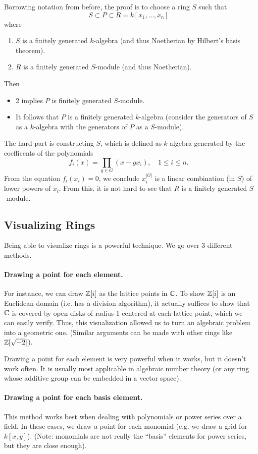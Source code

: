Borrowing notation from before, the proof is to choose a ring $S$ such that
\[
    S \subset P \subset R = k[x_1, \dots, x_n]
\]
where
\begin{enumerate}
    \item $S$ is a finitely generated $k$-algebra (and thus Noetherian by Hilbert's basis theorem).
    \item $R$ is a finitely generated $S$-module (and thus Noetherian).
\end{enumerate}
Then
\begin{itemize}
    \item 2 implies $P$ is finitely generated $S$-module.
    \item It follows that $P$ is a finitely generated $k$-algebra (consider the generators of $S$ as a $k$-algebra with the generators of $P$ as a $S$-module).
\end{itemize}
The hard part is constructing $S$, which is defined as $k$-algebra generated by the coefficents of the polynomials
\[
    f_i(x) = \prod_{g \in G} (x-gx_i), \quad 1 \leq i \leq n.
\]
From the equation $f_i(x_i) = 0$, we conclude $x_i^{|G|}$ is a linear combination (in $S$) of lower powers of $x_i$. From this, it is not hard to see that $R$ is a finitely generated $S$-module.

\subsection{Visualizing Rings}
Being able to visualize rings is a powerful technique. We go over 3 different methods.

\paragraph{Drawing a point for each element.} For instance, we can draw ${\mathbb Z}[i]$ as the lattice points in ${\mathbb C}$. To show ${\mathbb Z}[i]$ is an Euclidean domain (i.e. has a division algorithm), it actually suffices to show that ${\mathbb C}$ is covered by open disks of radius 1 centered at each lattice point, which we can easily verify. Thus, this visualization allowed us to turn an algebraic problem into a geometric one. (Similar arguments can be made with other rings like ${\mathbb Z}[\sqrt{-2}]$).

Drawing a point for each element is very powerful when it works, but it doesn't work often. It is usually most applicable in algebraic number theory (or any ring whose additive group can be embedded in a vector space).

\paragraph{Drawing a point for each basis element.} This method works best when dealing with polynomials or power series over a field. In these cases, we draw a point for each monomial (e.g. we draw a grid for $k[x,y]$). (Note: monomials are not really the ``basis'' elements for power series, but they are close enough).

